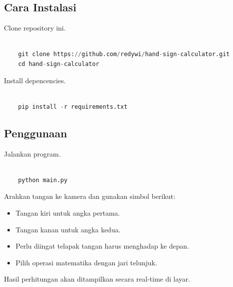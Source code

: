 \documentclass[11pt,a4paper]{article}
\begin{document}
    \subsection{Cara Instalasi}
    Clone repository ini.
    \begin{lstlisting}[language=Python, caption=Clone Repository]
    
    git clone https://github.com/redywi/hand-sign-calculator.git  
    cd hand-sign-calculator  
    \end{lstlisting}
    Install depencencies.
    \begin{lstlisting}[language=Python, caption=Pemasangan Dependencies]
    
    pip install -r requirements.txt   
    \end{lstlisting}

    \subsection{Penggunaan}
    Jalankan program.
    \begin{lstlisting}[language=Python, caption=Jalankan Program]

    python main.py  
    \end{lstlisting}
    Arahkan tangan ke kamera dan gunakan simbol berikut:
    \begin{itemize}
        \item Tangan kiri untuk angka pertama.
        \item Tangan kanan untuk angka kedua.
        \item Perlu diingat telapak tangan harus menghadap ke depan.
        \item Pilih operasi matematika dengan jari telunjuk.
    \end{itemize}
    Hasil perhitungan akan ditampilkan secara real-time di layar.
    
\newpage


\end{document}

